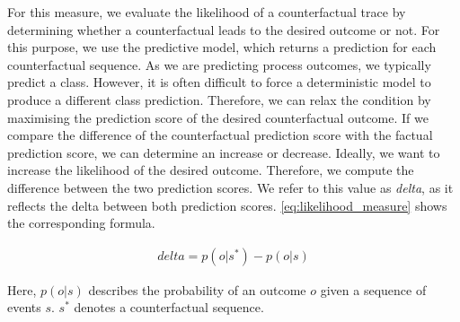 \documentclass[./../../paper.tex]{subfiles}
\begin{document}
For this measure, we evaluate the likelihood of a counterfactual trace by determining whether a counterfactual leads to the desired outcome or not. For this purpose, we use the predictive model, which returns a prediction for each counterfactual sequence. As we are predicting process outcomes, we typically predict a class. However, it is often difficult to force a deterministic model to produce a different class prediction. Therefore, we can relax the condition by maximising the prediction score of the desired counterfactual outcome\autocite{molnar2019}. If we compare the difference of the counterfactual prediction score with the factual prediction score, we can determine an increase or decrease. Ideally, we want to increase the likelihood of the desired outcome. Therefore, we compute the difference between the two prediction scores. We refer to this value as \emph{delta}, as it reflects the delta between both prediction scores. \autoref{eq:likelihood_measure} shows the corresponding formula.

\begin{align}
    \label{eq:likelihood_measure}
    delta = p(o|s^*)-p(o|s)
\end{align}

\noindent Here, $p(o|s)$ describes the probability of an outcome $o$ given a sequence of events $s$. $s^*$ denotes a counterfactual sequence. 

\end{document}
